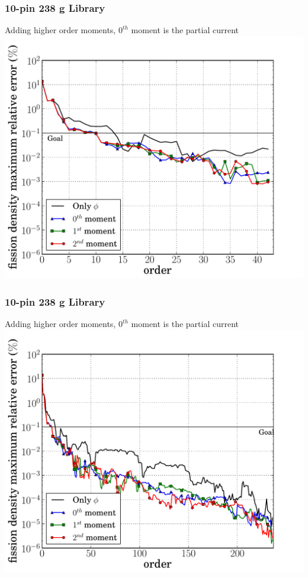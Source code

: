 \documentclass[fleqn]{beamer}
\begin{document}
  \begin{frame}
    \frametitle{10-pin 238 g Library}
    \begin{center}
    Adding higher order moments, $0^{th}$ moment is the partial current
    \includegraphics[trim=.1cm .25cm 2.0cm .4cm, clip=true, totalheight=.8\textheight]{10pin_238_angular_comparison_fission_10-pin-44}
    \end{center}
  \end{frame}

  \begin{frame}
    \frametitle{10-pin 238 g Library}
    \begin{center}
    Adding higher order moments, $0^{th}$ moment is the partial current
    \includegraphics[trim=.1cm .25cm 2.0cm .4cm, clip=true, totalheight=.8\textheight]{10pin_238_angular_comparison_fission_10-pin-238}
    \end{center}
  \end{frame}
\end{document}
